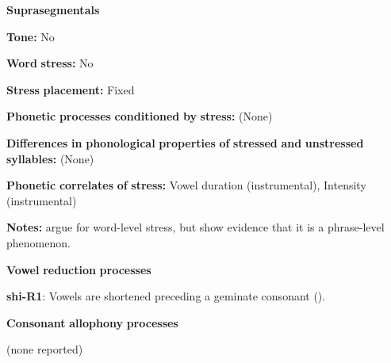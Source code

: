 \documentclass[output=paper]{langsci/langscibook}
\begin{document}
\begin{styleBody}
\textbf{Suprasegmentals}
\end{styleBody}

\begin{styleBody}
\textbf{Tone:} No
\end{styleBody}

\begin{styleBody}
\textbf{Word} \textbf{stress:} No
\end{styleBody}

\begin{styleBody}
\textbf{Stress} \textbf{placement:} Fixed
\end{styleBody}

\begin{styleBody}
\textbf{Phonetic} \textbf{processes} \textbf{conditioned} \textbf{by} \textbf{stress:} (None)
\end{styleBody}

\begin{styleBody}
\textbf{Differences} \textbf{in} \textbf{phonological} \textbf{properties} \textbf{of} \textbf{stressed} \textbf{and} \textbf{unstressed} \textbf{syllables:} (None)
\end{styleBody}

\begin{styleBody}
\textbf{Phonetic} \textbf{correlates} \textbf{of} \textbf{stress:} Vowel duration (instrumental), Intensity (instrumental)
\end{styleBody}

\begin{styleBody}
\textbf{Notes:} \citet{GordonNafi2012} argue for word-level stress, but \citet{RoettgerEtAl2015} show evidence that it is a phrase-level phenomenon.
\end{styleBody}

\begin{styleBody}
\textbf{Vowel} \textbf{reduction} \textbf{processes}
\end{styleBody}

\begin{styleBody}
\textbf{shi-R1}: Vowels are shortened preceding a geminate consonant (\citealt{DellElmedlouai2002}).
\end{styleBody}

\begin{styleBody}
\textbf{Consonant} \textbf{allophony} \textbf{processes}
\end{styleBody}

\begin{styleBody}
(none reported)
\end{styleBody}
\end{document}
